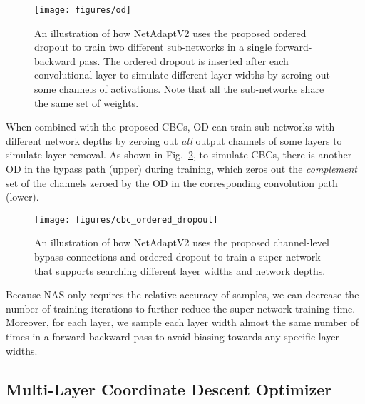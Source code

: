 \begin{figure}[t]
\begin{center}
   \texttt{[image: figures/od]}
\end{center}
   \caption{An illustration of how NetAdaptV2 uses the proposed ordered dropout to train two different sub-networks in a single forward-backward pass. The ordered dropout is inserted after each convolutional layer to simulate different layer widths by zeroing out some channels of activations. Note that all the sub-networks share the same set of weights.}
\label{fig:ordered_dropout}
\end{figure}


When combined with the proposed CBCs, OD can train sub-networks with different network depths by zeroing out \emph{all} output channels of some layers to simulate layer removal. As shown in Fig.~\ref{fig:bypass_connections_train}, to simulate CBCs, there is another OD in the bypass path (upper) during training, which zeros out the \textit{complement} set of the channels zeroed by the OD in the corresponding convolution path (lower).

\begin{figure}[t]
\begin{center}
   \texttt{[image: figures/cbc\_ordered\_dropout]}
\end{center}
   \vspace{-3mm}
   \caption{An illustration of how NetAdaptV2 uses the proposed channel-level bypass connections and ordered dropout to train a super-network that supports searching different layer widths and network depths.}
\label{fig:bypass_connections_train}
\end{figure}

Because NAS only requires the relative accuracy of samples, we can decrease the number of training iterations to further reduce the super-network training time. Moreover, for each layer, we sample each layer width almost the same number of times in a forward-backward pass to avoid biasing towards any specific layer widths.


\subsection{Multi-Layer Coordinate Descent Optimizer}
\label{subsec:optimizer}

